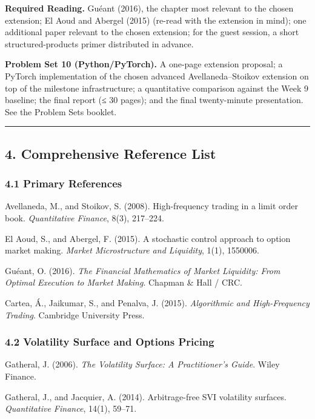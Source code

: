 \documentclass[
]{article}
\begin{document}
\textbf{Required Reading.} Guéant (2016), the chapter most relevant to
the chosen extension; El Aoud and Abergel (2015) (re-read with the
extension in mind); one additional paper relevant to the chosen
extension; for the guest session, a short structured-products primer
distributed in advance.

\textbf{Problem Set 10 (Python/PyTorch).} A one-page extension proposal;
a PyTorch implementation of the chosen advanced Avellaneda--Stoikov
extension on top of the milestone infrastructure; a quantitative
comparison against the Week 9 baseline; the final report (≤ 30 pages);
and the final twenty-minute presentation. See the Problem Sets booklet.

\begin{center}\rule{0.5\linewidth}{0.5pt}\end{center}

\subsection{4. Comprehensive Reference
List}\label{comprehensive-reference-list}

\subsubsection{4.1 Primary References}\label{primary-references}

Avellaneda, M., and Stoikov, S. (2008). High-frequency trading in a
limit order book. \emph{Quantitative Finance}, 8(3), 217--224.

El Aoud, S., and Abergel, F. (2015). A stochastic control approach to
option market making. \emph{Market Microstructure and Liquidity}, 1(1),
1550006.

Guéant, O. (2016). \emph{The Financial Mathematics of Market Liquidity:
From Optimal Execution to Market Making}. Chapman \& Hall / CRC.

Cartea, Á., Jaikumar, S., and Penalva, J. (2015). \emph{Algorithmic and
High-Frequency Trading}. Cambridge University Press.

\subsubsection{4.2 Volatility Surface and Options
Pricing}\label{volatility-surface-and-options-pricing}

Gatheral, J. (2006). \emph{The Volatility Surface: A Practitioner's
Guide}. Wiley Finance.

Gatheral, J., and Jacquier, A. (2014). Arbitrage-free SVI volatility
surfaces. \emph{Quantitative Finance}, 14(1), 59--71.
\end{document}
